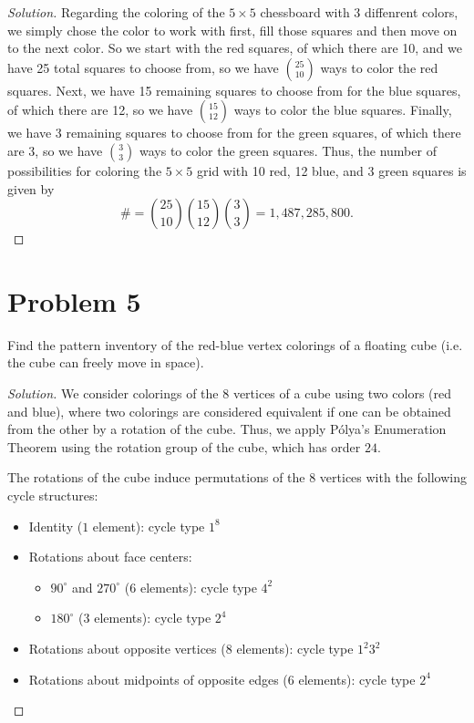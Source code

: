\documentclass[12pt]{amsart}
\newenvironment{solution}
{\begin{proof}[Solution]}
{\end{proof}}
\begin{document}
\begin{onehalfspace}
        \begin{solution}
            Regarding the coloring of the $5\times 5$ chessboard with 3 diffenrent colors, we simply chose the color to
            work with first, fill those squares and then move on to the next color.
            So we start with the red squares, of which there are 10, and we have 25 total squares to choose from,
            so we have $\binom{25}{10}$ ways to color the red squares.
            Next, we have 15 remaining squares to choose from for the blue squares, of which there are 12,
            so we have $\binom{15}{12}$ ways to color the blue squares.
            Finally, we have 3 remaining squares to choose from for the green squares, of which there are 3, so we
            have $\binom{3}{3}$ ways to color the green squares.
            Thus, the number of possibilities for coloring the $5\times 5$ grid with 10 red, 12 blue, and 3 green squares is given by
            \[
                \# = \binom{25}{10}\binom{15}{12}\binom{3}{3} = 1,487,285,800.
            \]
        \end{solution}

        \section{Problem 5}
        Find the pattern inventory of the red-blue vertex colorings of a floating cube (i.e. the cube can freely move
        in space).

        \begin{solution}
            We consider colorings of the $8$ vertices of a cube using two colors (red and blue), where two colorings
            are considered equivalent if one can be obtained from the other by a rotation of the cube. Thus, we apply
            P\'olya's Enumeration Theorem using the rotation group of the cube, which has order $24$.

            The rotations of the cube induce permutations of the $8$ vertices with the following cycle structures:
            \begin{itemize}
                \item[-] Identity ($1$ element): cycle type $1^8$
                \item[-] Rotations about face centers:
                \begin{itemize}
                    \item[-] $90^\circ$ and $270^\circ$ ($6$ elements): cycle type $4^2$
                    \item[-] $180^\circ$ ($3$ elements): cycle type $2^4$
                \end{itemize}
                \item[-] Rotations about opposite vertices ($8$ elements): cycle type $1^2 3^2$
                \item[-] Rotations about midpoints of opposite edges ($6$ elements): cycle type $2^4$
            \end{itemize}


\end{solution}
\end{onehalfspace}
\end{document}
